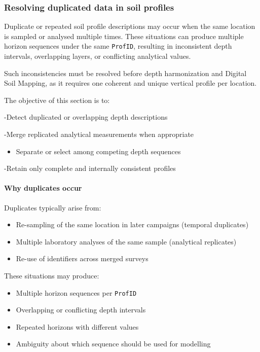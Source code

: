 \documentclass[
  10pt,
  b5paper,
  oneside]{book}
\providecommand{\tightlist}{%
  \setlength{\itemsep}{0pt}\setlength{\parskip}{0pt}}
\begin{document}
\subsubsection{Resolving duplicated data in soil profiles}\label{resolving-duplicated-data-in-soil-profiles}

Duplicate or repeated soil profile descriptions may occur when the same location is sampled or analysed multiple times. These situations can produce multiple horizon sequences under the same \texttt{ProfID}, resulting in inconsistent depth intervals, overlapping layers, or conflicting analytical values.

Such inconsistencies must be resolved before depth harmonization and Digital Soil Mapping, as it requires one coherent and unique vertical profile per location.

The objective of this section is to:

-Detect duplicated or overlapping depth descriptions

-Merge replicated analytical measurements when appropriate

\begin{itemize}
\tightlist
\item
  Separate or select among competing depth sequences
\end{itemize}

-Retain only complete and internally consistent profiles

\paragraph*{Why duplicates occur}\label{why-duplicates-occur}

Duplicates typically arise from:

\begin{itemize}
\item
  Re-sampling of the same location in later campaigns (temporal duplicates)
\item
  Multiple laboratory analyses of the same sample (analytical replicates)
\item
  Re-use of identifiers across merged surveys
\end{itemize}

These situations may produce:

\begin{itemize}
\item
  Multiple horizon sequences per \texttt{ProfID}
\item
  Overlapping or conflicting depth intervals
\item
  Repeated horizons with different values
\item
  Ambiguity about which sequence should be used for modelling
\end{itemize}
\end{document}

